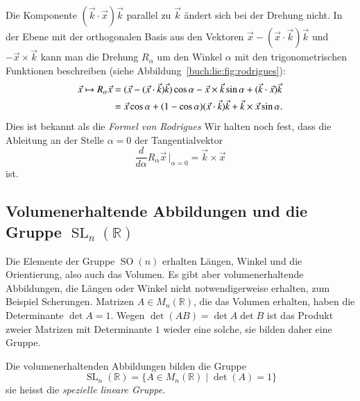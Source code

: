 Die Komponente $(\vec{k}\cdot\vec{x})\vec{k}$ parallel zu $\vec{k}$
ändert sich bei der Drehung nicht.
In der Ebene mit der orthogonalen Basis aus den Vektoren
$\vec{x}-(\vec{x}\cdot\vec{k})\vec{k}$ und $-\vec{x}\times\vec{k}$
kann man die Drehung $R_\alpha$ um den Winkel $\alpha$ mit den
trigonometrischen Funktionen beschreiben
(siehe Abbildung~\ref{buch:lie:fig:rodrigues}):
\begin{align}
\vec{x}
\mapsto
R_\alpha\vec{x}
&=
(\vec{x}-(\vec{x}\cdot\vec{k})\vec{k})
\cos\alpha
-
\vec{x}\times\vec{k}
\sin\alpha
+
(\vec{k}\cdot\vec{x})\vec{k}
\notag
\\
&=
\vec{x}\cos\alpha
+
(1-\cos\alpha)(\vec{x}\cdot\vec{k})\vec{k}
+
\vec{k}\times\vec{x}\sin\alpha.
\label{buch:lie:eqn:rodrigues}
\end{align}
Dies ist bekannt als die {\em Formel von Rodrigues}
%
%
Wir halten noch fest, dass die Ableitung an der Stelle $\alpha=0$
der Tangentialvektor
\begin{equation}
\frac{d}{d\alpha}R_\alpha\vec{x}\,\bigg|_{\alpha=0}
=
\vec{k}\times\vec{x}
\label{buch:lie:eqn:so3tangentialvektor}
\end{equation}
ist.

%
%
\subsection{Volumenerhaltende Abbildungen und
die Gruppe $\operatorname{SL}_n(\mathbb{R})$
\label{buch:gruppen:sl}}
Die Elemente der Gruppe $\operatorname{SO}(n)$ erhalten Längen, Winkel und die
Orientierung, also auch das Volumen.
Es gibt aber volumenerhaltende Abbildungen, die Längen oder Winkel
nicht notwendigerweise erhalten, zum Beispiel Scherungen.
Matrizen $A\in M_n(\mathbb{R})$, die das Volumen erhalten,
haben die Determinante $\det A=1$.
Wegen $\det(AB)=\det A\det B$ ist das Produkt zweier Matrizen mit
Determinante $1$ wieder eine solche, sie bilden daher eine Gruppe.

\begin{definition}
Die volumenerhaltenden Abbildungen bilden die Gruppe
%
\[
\operatorname{SL}_n(\mathbb{R})
=
\{
A\in M_n(\mathbb{R})
\;|\;
\det (A) = 1
\}
\]
sie heisst die {\em spezielle lineare Gruppe}.
%
%
%
\end{definition}

